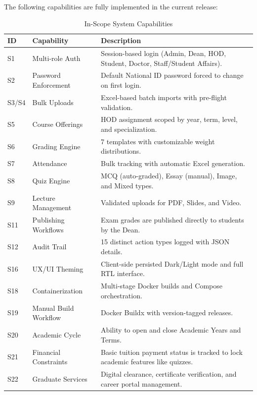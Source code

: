The following capabilities are fully implemented in the current release:

\begin{table}[H]
    \centering
    \renewcommand{\arraystretch}{1.2}
    \begin{tabular}{|p{}|p{}|p{}|}
        \hline
        \textbf{ID} & \textbf{Capability} & \textbf{Description} \\
        \hline
        S1 & Multi-role Auth & Session-based login (Admin, Dean, HOD, Student, Doctor, Staff/Student Affairs). \\
        \hline
        S2 & Password Enforcement & Default National ID password forced to change on first login. \\
        \hline
        S3/S4 & Bulk Uploads & Excel-based batch imports with pre-flight validation. \\
        \hline
        S5 & Course Offerings & HOD assignment scoped by year, term, level, and specialization. \\
        \hline
        S6 & Grading Engine & 7 templates with customizable weight distributions. \\
        \hline
        S7 & Attendance & Bulk tracking with automatic Excel generation. \\
        \hline
        S8 & Quiz Engine & MCQ (auto-graded), Essay (manual), Image, and Mixed types. \\
        \hline
        S9 & Lecture Management & Validated uploads for PDF, Slides, and Video. \\
        \hline
        S11 & Publishing Workflows & Exam grades are published directly to students by the Dean. \\
        \hline
        S12 & Audit Trail & 15 distinct action types logged with JSON details. \\
        \hline
        S16 & UX/UI Theming & Client-side persisted Dark/Light mode and full RTL interface. \\
        \hline
        S18 & Containerization & Multi-stage Docker builds and Compose orchestration. \\
        \hline
        S19 & Manual Build Workflow & Docker Buildx with version-tagged releases. \\
        \hline
        S20 & Academic Cycle & Ability to open and close Academic Years and Terms. \\
        \hline
        S21 & Financial Constraints & Basic tuition payment status is tracked to lock academic features like quizzes. \\
        \hline
        S22 & Graduate Services & Digital clearance, certificate verification, and career portal management. \\
        \hline
    \end{tabular}
    \caption{In-Scope System Capabilities}
    \label{tab:in_scope}
\end{table}


